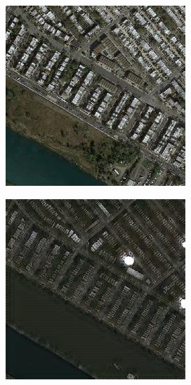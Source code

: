 \begin{figure}
  \medskip

  \begin{subfigure}[t]{.2\textwidth}
    \centering
    \includegraphics[width=\linewidth]{images/cycleGanResults/Satelite6_Or_Ld120_E100_Lr0002.jpg}
  \end{subfigure}
  \begin{subfigure}[t]{.2\textwidth}
    \centering
    \includegraphics[width=\linewidth]{images/cycleGanResults/Satelite6Ld120_E100_Lr0002.jpg}

\end{subfigure}
\end{figure}

